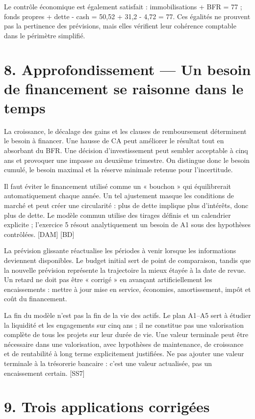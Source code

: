 \documentclass[12pt,a4paper]{article}
\begin{document}
Le contrôle économique est également satisfait : immobilisations + BFR = 77 ; fonds propres + dette - cash = 50,52 + 31,2 - 4,72 = 77. Ces égalités ne prouvent pas la pertinence des prévisions, mais elles vérifient leur cohérence comptable dans le périmètre simplifié.

\section*{8. Approfondissement --- Un besoin de financement se raisonne dans le temps}
La croissance, le décalage des gains et les clauses de remboursement déterminent le besoin à financer. Une hausse de CA peut améliorer le résultat tout en absorbant du BFR. Une décision d’investissement peut sembler acceptable à cinq ans et provoquer une impasse au deuxième trimestre. On distingue donc le besoin cumulé, le besoin maximal et la réserve minimale retenue pour l’incertitude.


Il faut éviter le financement utilisé comme un « bouchon » qui équilibrerait automatiquement chaque année. Un tel ajustement masque les conditions de marché et peut créer une circularité : plus de dette implique plus d’intérêts, donc plus de dette. Le modèle commun utilise des tirages définis et un calendrier explicite ; l’exercice 5 résout analytiquement un besoin de A1 sous des hypothèses contrôlées. [DAM] [BD]


La prévision glissante réactualise les périodes à venir lorsque les informations deviennent disponibles. Le budget initial sert de point de comparaison, tandis que la nouvelle prévision représente la trajectoire la mieux étayée à la date de revue. Un retard ne doit pas être « corrigé » en avançant artificiellement les encaissements : mettre à jour mise en service, économies, amortissement, impôt et coût du financement.


La fin du modèle n’est pas la fin de la vie des actifs. Le plan A1--A5 sert à étudier la liquidité et les engagements sur cinq ans ; il ne constitue pas une valorisation complète de tous les projets sur leur durée de vie. Une valeur terminale peut être nécessaire dans une valorisation, avec hypothèses de maintenance, de croissance et de rentabilité à long terme explicitement justifiées. Ne pas ajouter une valeur terminale à la trésorerie bancaire : c’est une valeur actualisée, pas un encaissement certain. [SS7]

\section*{9. Trois applications corrigées}
\end{document}
